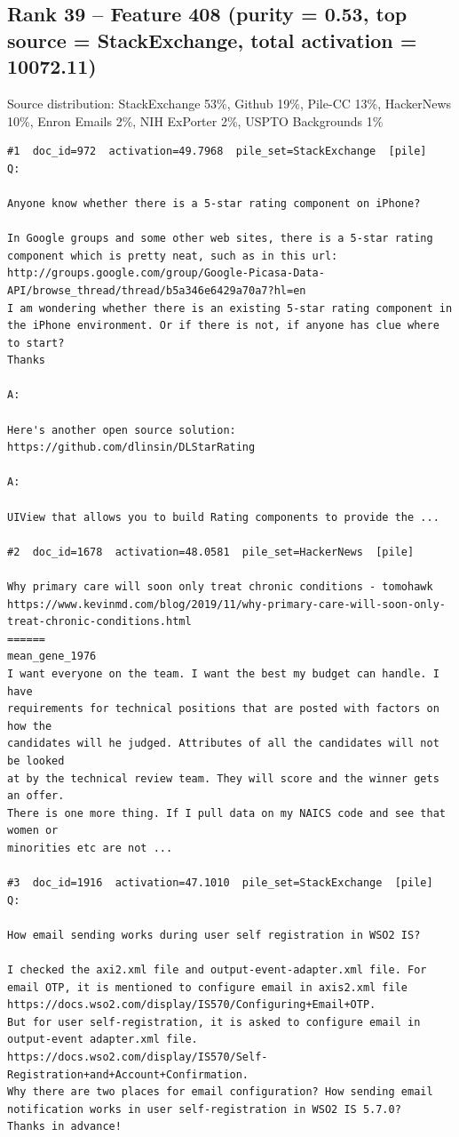 \subsection*{Rank 39 -- Feature 408 (purity = 0.53, top source = StackExchange, total activation = 10072.11)}

Source distribution: StackExchange 53\%, Github 19\%, Pile-CC 13\%, HackerNews 10\%, Enron Emails 2\%, NIH ExPorter 2\%, USPTO Backgrounds 1\%

\begin{verbatim}
#1  doc_id=972  activation=49.7968  pile_set=StackExchange  [pile]
Q:

Anyone know whether there is a 5-star rating component on iPhone?

In Google groups and some other web sites, there is a 5-star rating component which is pretty neat, such as in this url:
http://groups.google.com/group/Google-Picasa-Data-API/browse_thread/thread/b5a346e6429a70a7?hl=en
I am wondering whether there is an existing 5-star rating component in the iPhone environment. Or if there is not, if anyone has clue where to start?
Thanks

A:

Here's another open source solution: https://github.com/dlinsin/DLStarRating 

A:

UIView that allows you to build Rating components to provide the ...

#2  doc_id=1678  activation=48.0581  pile_set=HackerNews  [pile]

Why primary care will soon only treat chronic conditions - tomohawk
https://www.kevinmd.com/blog/2019/11/why-primary-care-will-soon-only-treat-chronic-conditions.html
======
mean_gene_1976
I want everyone on the team. I want the best my budget can handle. I have
requirements for technical positions that are posted with factors on how the
candidates will he judged. Attributes of all the candidates will not be looked
at by the technical review team. They will score and the winner gets an offer.
There is one more thing. If I pull data on my NAICS code and see that women or
minorities etc are not ...

#3  doc_id=1916  activation=47.1010  pile_set=StackExchange  [pile]
Q:

How email sending works during user self registration in WSO2 IS?

I checked the axi2.xml file and output-event-adapter.xml file. For email OTP, it is mentioned to configure email in axis2.xml file https://docs.wso2.com/display/IS570/Configuring+Email+OTP.
But for user self-registration, it is asked to configure email in output-event adapter.xml file.
https://docs.wso2.com/display/IS570/Self-Registration+and+Account+Confirmation.
Why there are two places for email configuration? How sending email notification works in user self-registration in WSO2 IS 5.7.0?
Thanks in advance!


\end{verbatim}

